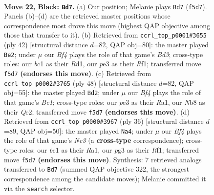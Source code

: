 \documentclass[11pt]{article}
\begin{document}
\clearpage

\begin{figure}[p]\centering
\begin{subfigure}{0.46\textwidth}\centering
\resizebox{\linewidth}{!}{%
\newchessgame
\chessboard[
  setfen={rnr5/ppp1b1k1/q4pp1/P2p1b2/1P1P1P1N/4P1P1/3Q4/RNB2RK1 b - - 2 22},
  showmover=false,
  pgfstyle=straightmove, color=movearrow, markmove={f5-d7}
]}
\caption{}
\end{subfigure}\hfill
\begin{subfigure}{0.46\textwidth}\centering
\resizebox{\linewidth}{!}{%
\newchessgame
\chessboard[
  setfen={2rqrbk1/5p1p/1p1p2p1/3Pn2n/p1P5/3BB2Q/PP1N2PP/3R1R1K w - - 7 22},
  showmover=false,
  pgfstyle=straightmove, color=movearrow, markmove={d3-e2}
]}
\caption{}
\end{subfigure}
\\[4pt]
\begin{subfigure}{0.46\textwidth}\centering
\resizebox{\linewidth}{!}{%
\newchessgame
\chessboard[
  setfen={q3r2k/1p1r1pp1/2p1p2p/p2nRb2/P2P3P/1BP5/1P2QPP1/R1B3K1 w - - 5 25},
  showmover=false,
  pgfstyle=straightmove, color=movearrow, markmove={c1-d2}
]}
\caption{}
\end{subfigure}\hfill
\begin{subfigure}{0.46\textwidth}\centering
\resizebox{\linewidth}{!}{%
\newchessgame
\chessboard[
  setfen={r1b1nk1r/1p3p1p/p1n1p3/2qpPP2/7Q/2NB4/PPP3PP/R4R1K w - - 5 19},
  showmover=false,
  pgfstyle=straightmove, color=movearrow, markmove={c3-a4}
]}
\caption{}
\end{subfigure}
\caption{\textbf{Move 22, Black: \texttt{Bd7}.} (a) Our position; Melanie plays \texttt{Bd7} (\texttt{f5d7}). Panels (b)--(d) are the retrieved master positions whose correspondence most drove this move (highest QAP objective among those that transfer to it). (b) Retrieved from \texttt{ccrl\_top\_p0001\#3655} (ply 42) [structural distance $d$=82, QAP obj=80]: the master played \texttt{Be2}; under $\mu$ our \emph{Bf4} plays the role of that game's \emph{Bd3}; cross-type roles: our \emph{b}c1 as their \emph{R}d1, our \emph{p}e3 as their \emph{R}f1; transferred move \texttt{f5d7} \textbf{(endorses this move)}. (c) Retrieved from \texttt{ccrl\_top\_p0002\#3765} (ply 48) [structural distance $d$=82, QAP obj=55]: the master played \texttt{Bd2}; under $\mu$ our \emph{Bf4} plays the role of that game's \emph{Bc1}; cross-type roles: our \emph{p}e3 as their \emph{R}a1, our \emph{N}b8 as their \emph{Q}e2; transferred move \texttt{f5d7} \textbf{(endorses this move)}. (d) Retrieved from \texttt{ccrl\_top\_p0000\#3967} (ply 36) [structural distance $d$=89, QAP obj=50]: the master played \texttt{Na4}; under $\mu$ our \emph{Bf4} plays the role of that game's \emph{Nc3} (a \textbf{cross-type} correspondence); cross-type roles: our \emph{b}c1 as their \emph{R}a1, our \emph{p}g3 as their \emph{R}f1; transferred move \texttt{f5d7} \textbf{(endorses this move)}. Synthesis: 7 retrieved analogs transferred to \texttt{Bd7} (summed QAP objective 322, the strongest correspondence among the candidate moves); Melanie committed it via the \texttt{search} selector.}
\label{fig:thought-m43}
\end{figure}
\end{document}
